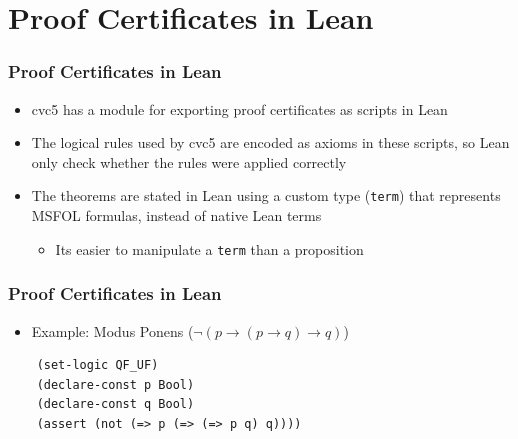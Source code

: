 \documentclass[usepdftitle=false,aspectratio=169,usenames,dvipsnames]{beamer}
\newcommand\vitem{\vfill\item}
\begin{document}

\section{Proof Certificates in Lean}

\begin{frame}
  \frametitle{Proof Certificates in Lean}
  \begin{itemize}
    \item cvc5 has a module for exporting proof certificates as scripts in Lean
    \vitem The logical rules used by cvc5 are encoded as axioms in these scripts, so Lean only check whether the rules were applied correctly
    \vitem The theorems are stated in Lean using a custom type (\texttt{term}) that represents MSFOL formulas, instead of native Lean terms
    \begin{itemize}
      \item Its easier to manipulate a \texttt{term} than a proposition
    \end{itemize}

  \end{itemize}
\end{frame}

\begin{frame}[fragile]
  \frametitle{Proof Certificates in Lean}
  \begin{itemize}
    \item Example: Modus Ponens ($\neg (p \rightarrow (p \rightarrow q) \rightarrow q)$)
  \end{itemize}
  \vfill
  \begin{verbatim}
    (set-logic QF_UF)
    (declare-const p Bool)
    (declare-const q Bool)
    (assert (not (=> p (=> (=> p q) q))))
  \end{verbatim}
\end{frame}
\end{document}
